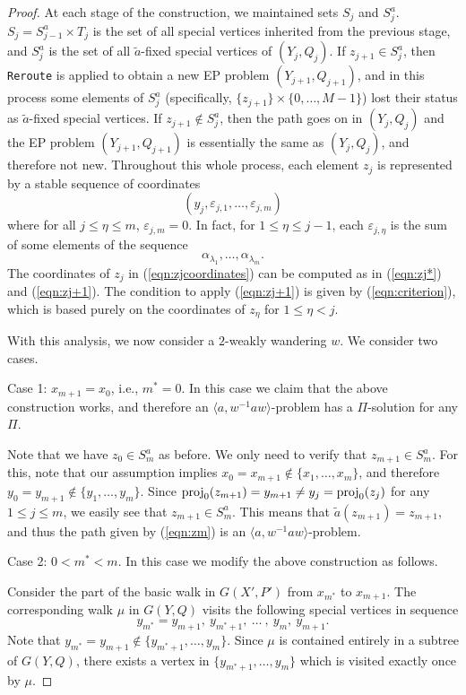 \documentclass[10pt,a4paper]{amsart}
\theoremstyle{definition}
\theoremstyle{definition}
\numberwithin{equation}{section}
\begin{document}
\begin{proof}
At each stage of the construction, we maintained sets $S_j$ and $S_j^a$. $S_j=S^a_{j-1}\times T_j$ is the set of all special vertices inherited from the previous stage, and $S_j^a$ is the set of all $\tilde{a}$-fixed special vertices of $(Y_j, Q_j)$. If $z_{j+1}\in S_j^a$, then {\tt Reroute} is applied to obtain a new EP problem $(Y_{j+1}, Q_{j+1})$, and in this process some elements of $S_j^a$ (specifically, $\{z_{j+1}\}\times \{0, \dots, M-1\}$) lost their status as $\tilde{a}$-fixed special vertices. If $z_{j+1}\not\in S_j^a$, then the path goes on in $(Y_j, Q_j)$ and the EP problem $(Y_{j+1}, Q_{j+1})$ is essentially the same as $(Y_j, Q_j)$, and therefore not new. Throughout this whole process, each element $z_j$ is represented by a stable sequence of coordinates
\begin{equation}\label{eqn:zjcoordinates} (y_j, \varepsilon_{j,1}, \dots, \varepsilon_{j, m}) \end{equation}
where for all $j\leq \eta\leq m$, $\varepsilon_{j, m}=0$. In fact, for $1\leq \eta\leq j-1$, each $\varepsilon_{j, \eta}$ is the sum of some elements of the sequence
$$ \alpha_{\lambda_1}, \dots, \alpha_{\lambda_m}. $$
The coordinates of $z_j$ in (\ref{eqn:zjcoordinates}) can be computed as in (\ref{eqn:zj*}) and (\ref{eqn:zj+1}). The condition to apply (\ref{eqn:zj+1}) is given by (\ref{eqn:criterion}), which is based purely on the coordinates of $z_\eta$ for $1\leq \eta<j$.

With this analysis, we now consider a $2$-weakly wandering $w$. We consider two cases.

Case 1: $x_{m+1}=x_0$, i.e., $m^*=0$. In this case we claim that the above construction works, and therefore an $\langle a, w^{-1}aw\rangle$-problem has a $\Pi$-solution for any $\Pi$. 

Note that we have $z_0\in S_m^a$ as before. We only need to verify that $z_{m+1}\in S_m^a$. For this, note that our assumption implies $x_0=x_{m+1}\not\in\{x_1, \dots, x_m\}$, and therefore $y_0=y_{m+1}\not\in \{y_1, \dots, y_m\}$. Since $\mbox{\rm proj}_0(z_{m+1})=y_{m+1}\neq y_j=\mbox{\rm proj}_0(z_j)$ for any $1\leq j\leq m$, we easily see that $z_{m+1}\in S_m^a$. This means that $\tilde{a}(z_{m+1})=z_{m+1}$, and thus the path given by (\ref{eqn:zm}) is an $\langle a, w^{-1}aw\rangle$-problem.

Case 2: $0<m^*<m$. In this case we modify the above construction as follows. 

Consider the part of the basic walk in $G(X', P')$ from $x_{m^*}$ to $x_{m+1}$. The corresponding walk $\mu$ in $G(Y, Q)$ visits the following special vertices in sequence
$$ y_{m^*}=y_{m+1}, \  y_{m^*+1}, \  \dots\ , \ y_m, \ y_{m+1}. $$
Note that $y_{m^*}=y_{m+1}\not\in \{y_{m^*+1},\dots, y_m\}$. Since $\mu$ is contained entirely in a subtree of $G(Y, Q)$, there exists a vertex in $\{y_{m^*+1},\dots, y_m\}$ which is visited exactly once by $\mu$. 


\end{proof}
\end{document}
